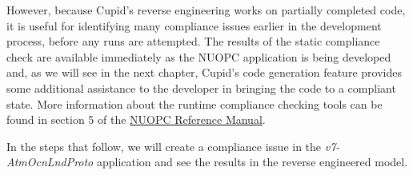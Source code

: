 \documentclass[oneside,11pt]{memoir}
\begin{document}
However, because Cupid's reverse engineering works on partially completed code, it is useful for identifying many compliance issues earlier in the development process, before any runs are attempted. The results of the static compliance check are available immediately as the NUOPC application is being developed and, as we will see in the next chapter, Cupid's code generation feature provides some additional assistance to the developer in bringing the code to a compliant state. More information about the runtime compliance checking tools can be found in section 5 of the \href{http://www.earthsystemmodeling.org/esmf_releases/public/ESMF\_6\_3\_0r/NUOPC_refdoc/node6.html}{NUOPC Reference Manual}.

In the steps that follow, we will create a compliance issue in the \emph{v7-AtmOcnLndProto} application and see the results in the reverse engineered model.
\end{document}
